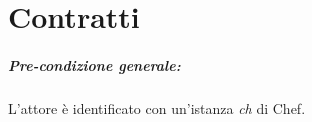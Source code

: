 \chapter{Contratti}

\paragraph{Pre-condizione generale:} L'attore è identificato con un'istanza \textit{ch} di Chef. 
